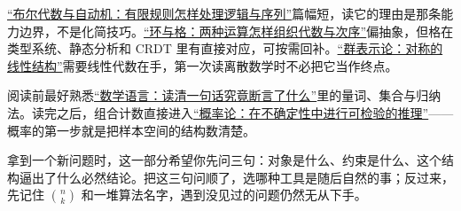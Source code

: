 \hyperref[ch:033]{``布尔代数与自动机：有限规则怎样处理逻辑与序列''}篇幅短，读它的理由是那条能力边界，不是化简技巧。\hyperref[ch:034]{``环与格：两种运算怎样组织代数与次序''}偏抽象，但格在类型系统、静态分析和 CRDT 里有直接对应，可按需回补。\hyperref[ch:035]{``群表示论：对称的线性结构''}需要线性代数在手，第一次读离散数学时不必把它当作终点。

阅读前最好熟悉\hyperref[ch:003]{``数学语言：读清一句话究竟断言了什么''}里的量词、集合与归纳法。读完之后，组合计数直接进入\hyperref[ch:036]{``概率论：在不确定性中进行可检验的推理''}——概率的第一步就是把样本空间的结构数清楚。

拿到一个新问题时，这一部分希望你先问三句：对象是什么、约束是什么、这个结构逼出了什么必然结论。把这三句问顺了，选哪种工具是随后自然的事；反过来，先记住 \(\binom nk\) 和一堆算法名字，遇到没见过的问题仍然无从下手。
